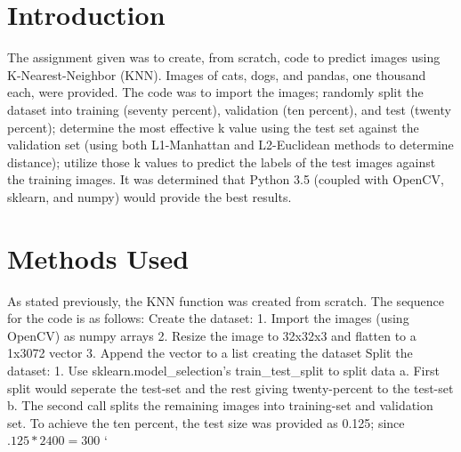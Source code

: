 

\section{Introduction}

The assignment given was to create, from scratch, code to predict images using K-Nearest-Neighbor (KNN). Images of cats, dogs, and pandas, one thousand each, were provided. The code was to import the images; randomly split the dataset into training (seventy percent), validation (ten percent), and test (twenty percent); determine the most effective k value using the test set against the validation set (using both L1-Manhattan and L2-Euclidean methods to determine distance); utilize those k values to predict the labels of the test images against the training images.  It was determined that Python 3.5 (coupled with OpenCV, sklearn, and numpy) would provide the best results. 

\section{Methods Used}

As stated previously, the KNN function was created from scratch. The sequence for the code is as follows:
Create the dataset:
	1. Import the images (using OpenCV) as numpy arrays
	2. Resize the image to 32x32x3 and flatten to a 1x3072 vector
	3. Append the vector to a list creating the dataset
Split the dataset:
	1. Use sklearn.model_selection's train_test_split to split data
		a. First split would seperate the test-set and the rest giving twenty-percent to the test-set
		b. The second call splits the remaining images into training-set and validation set. To achieve the ten percent, the test size was provided as 0.125; since $.125*2400=300$
` 